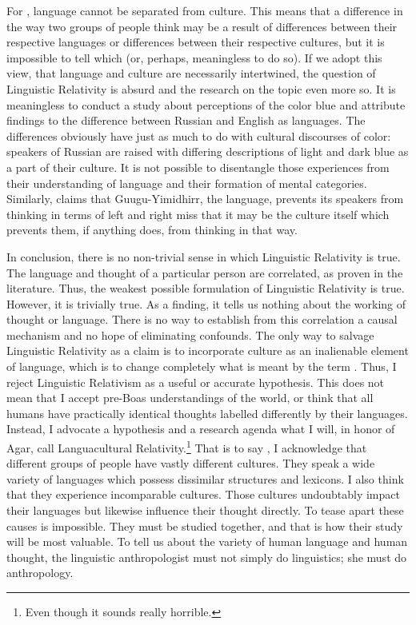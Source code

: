 \documentclass[man,12pt,natbib]{apa6}
\begin{document}
For \citet{Agar95}, language cannot be separated from culture. This means that
a difference in the way two groups of people think may be a result of
differences between their respective languages or differences between their
respective cultures, but it is impossible to tell which (or, perhaps,
meaningless to do so). If we adopt this view, that language and culture are
necessarily intertwined, the question of Linguistic Relativity is absurd and
the research on the topic even more so. It is meaningless to conduct a study
about perceptions of the color blue and attribute findings to the difference
between Russian and English as languages. The differences obviously have just
as much to do with cultural discourses of color: speakers of Russian are raised
with differing descriptions of light and dark blue as a part of their culture.
It is not possible to disentangle those experiences from their understanding of
language and their formation of mental categories. Similarly, claims that
Guugu-Yimidhirr, the language, prevents its speakers from thinking in terms of
left and right miss that it may be the culture itself which prevents them, if
anything does, from thinking in that way.

In conclusion, there is no non-trivial sense in which Linguistic Relativity is
true. The language and thought of a particular person are correlated, as proven
in the literature.  Thus, the weakest possible formulation of Linguistic
Relativity is true. However, it is trivially true. As a finding, it tells us
nothing about the working of thought or language. There is no way to establish
from this correlation a causal mechanism and no hope of eliminating confounds. 
The only way to salvage Linguistic Relativity as a claim is to incorporate
culture as an inalienable element of language, which is to change completely
what is meant by the term . Thus, I reject Linguistic Relativism as a useful or
accurate hypothesis. This does not mean that I accept pre-Boas understandings
of the world, or think that all humans have practically identical thoughts
labelled differently by their languages. Instead, I advocate a hypothesis and a
research agenda what I will, in honor of Agar, call Languacultural
Relativity.\footnote{Even though it sounds really horrible.} That is to say , I
acknowledge that different groups of people have vastly different cultures.
They speak a wide variety of languages which possess dissimilar structures and
lexicons. I also think that they experience incomparable cultures. Those
cultures undoubtably 
impact their languages but likewise influence their thought directly. To tease
apart these causes is impossible. They must be studied together, and that is
how their study will be most valuable. To tell us about the variety of human
language and human thought, the linguistic anthropologist must not simply do
linguistics; she must do anthropology.
\end{document}
